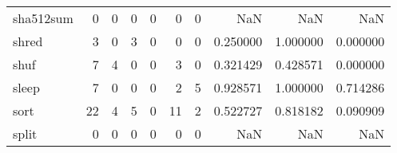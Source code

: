 \begin{longtable}{lrrrrrrrrr}
sha512sum &                                                  0 &                                                  0 &                                                  0 &                                                  0 &                                                  0 &                                                  0 &                                                NaN &                                    NaN &                                  NaN \\
shred     &                                                  3 &                                                  0 &                                                  3 &                                                  0 &                                                  0 &                                                  0 &                                           0.250000 &                               1.000000 &                             0.000000 \\
shuf      &                                                  7 &                                                  4 &                                                  0 &                                                  0 &                                                  3 &                                                  0 &                                           0.321429 &                               0.428571 &                             0.000000 \\
sleep     &                                                  7 &                                                  0 &                                                  0 &                                                  0 &                                                  2 &                                                  5 &                                           0.928571 &                               1.000000 &                             0.714286 \\
sort      &                                                 22 &                                                  4 &                                                  5 &                                                  0 &                                                 11 &                                                  2 &                                           0.522727 &                               0.818182 &                             0.090909 \\
split     &                                                  0 &                                                  0 &                                                  0 &                                                  0 &                                                  0 &                                                  0 &                                                NaN &                                    NaN &                                  NaN \\

\end{longtable}
